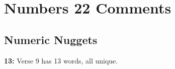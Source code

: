 \section{Numbers 22 Comments}

\subsection{Numeric Nuggets}
\textbf{13: } Verse 9 has 13 words, all unique.

